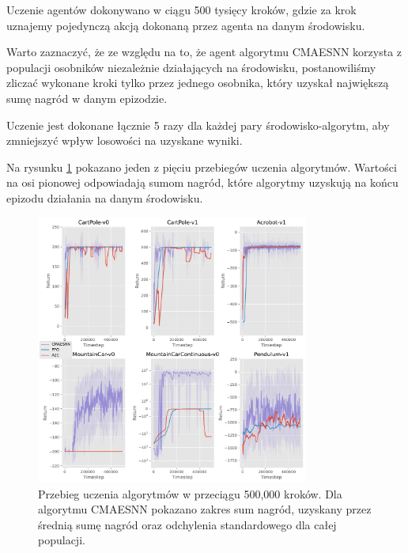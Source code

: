 \documentclass[12pt,a4paper]{article}
\begin{document}
Uczenie agentów dokonywano w ciągu 500 tysięcy kroków,
gdzie za krok uznajemy pojedynczą akcją dokonaną przez
agenta na danym środowisku.

Warto zaznaczyć, że ze względu na to, że agent
algorytmu CMAESNN korzysta z populacji osobników niezależnie
działających na środowisku, postanowiliśmy zliczać wykonane kroki tylko
przez jednego osobnika, który uzyskał największą sumę nagród
w danym epizodzie.

Uczenie jest dokonane łącznie 5 razy dla każdej pary środowisko-algorytm,
aby zmniejszyć wpływ losowości na uzyskane wyniki.

Na rysunku \ref{fig:training} pokazano jeden z pięciu przebiegów uczenia
algorytmów. Wartości na osi pionowej odpowiadają sumom nagród,
które algorytmy uzyskują na końcu epizodu działania na danym środowisku.

\begin{figure}[h]
  \centering
  \includegraphics[width=0.8\textwidth]{../plotting/plots/plot_all0.pdf}
  \caption{Przebieg uczenia algorytmów w przeciągu 500,000 kroków.
    Dla algorytmu CMAESNN pokazano zakres sum nagród, uzyskany przez
    średnią sumę nagród oraz odchylenia standardowego dla całej populacji.}
  \label{fig:training}
\end{figure}
\end{document}
